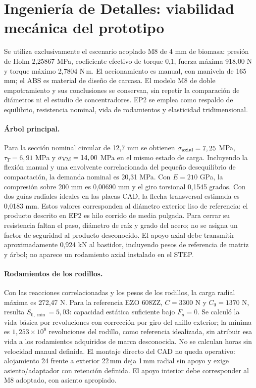 \section{Ingeniería de Detalles: viabilidad mecánica del prototipo}
Se utiliza exclusivamente el escenario acoplado M8 de 4 mm de biomasa:
presión de Holm 2,25867 MPa, coeficiente efectivo de torque 0,1,
fuerza máxima 918,00 N y torque máximo 2,7804 N\,m. El accionamiento es
manual, con manivela de 165 mm; el ABS es material de diseño de carcasa.
El modelo M8 de doble empotramiento y sus conclusiones se conservan, sin
repetir la comparación de diámetros ni el estudio de concentradores.
EP2 se emplea como respaldo de equilibrio, resistencia nominal, vida de
rodamientos y elasticidad tridimensional\cite{equipo_entrega2_2026}.

\paragraph{Árbol principal.}
Para la sección nominal circular de 12,7 mm se obtienen
$\sigma_{\rm axial}=7,25$ MPa, $\tau_T=6,91$ MPa y
$\sigma_{\rm VM}=14,00$ MPa en el mismo estado de carga.
Incluyendo la flexión manual y una envolvente correlacionada del pequeño
desequilibrio de compactación, la demanda nominal es 20,31 MPa.
Con $E=210$ GPa, la compresión sobre 200 mm es 0,00690 mm y el giro
torsional 0,1545 grados. Con dos guías radiales ideales en las placas CAD,
la flecha transversal estimada es 0,0183 mm. Estos valores corresponden
al diámetro exterior liso de referencia: el producto descrito en EP2 es
hilo corrido de media pulgada. Para cerrar su resistencia faltan el paso,
diámetro de raíz y grado del acero; no se asigna un factor de seguridad
al producto desconocido. El apoyo axial debe transmitir aproximadamente
0,924 kN al bastidor, incluyendo pesos de referencia de matriz y árbol;
no aparece un rodamiento axial instalado en el STEP.

\paragraph{Rodamientos de los rodillos.}
Con las reacciones correlacionadas y los pesos de los rodillos, la carga
radial máxima es 272,47 N. Para la referencia EZO 608ZZ,
$C=3300$ N y $C_0=1370$ N\cite{ezo_608zz_2026}, resulta
$S_{0,\min}=5,03$: capacidad estática suficiente bajo $F_a=0$.
Se calculó la vida básica por revoluciones con corrección por giro del
anillo exterior\cite{nhbb_vida_exterior_2026}; la mínima es
$1,253\times10^9$ revoluciones del rodillo, como referencia idealizada,
sin atribuir esa vida a los rodamientos adquiridos de marca desconocida.
No se calculan horas sin velocidad manual definida. El montaje directo
del CAD no queda operativo: alojamiento 24 frente a exterior 22\,mm deja
1\,mm radial sin apoyo y exige asiento/adaptador con retención definida.
El apoyo interior debe corresponder al M8 adoptado, con asiento apropiado.


